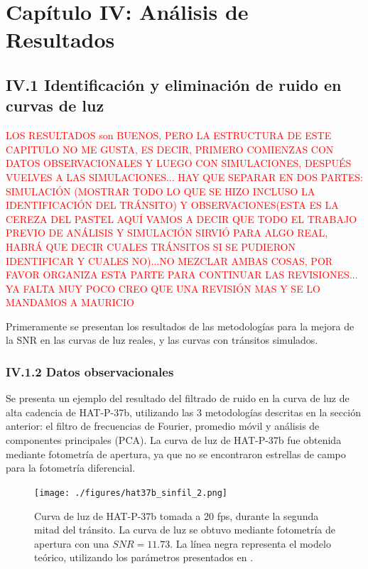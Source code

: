 \chapter*{\textbf{Capítulo IV: Análisis de Resultados}}
\label{ch:Resultados}
\setcounter{chapter}{4}
\setcounter{equation}{0}
\setcounter{figure}{0}
\setcounter{table}{0}

\section*{IV.1 Identificación y eliminación de ruido en curvas de luz}

\textcolor{red}{LOS RESULTADOS son BUENOS, PERO LA ESTRUCTURA DE ESTE CAPITULO NO ME GUSTA, ES DECIR, PRIMERO COMIENZAS CON DATOS OBSERVACIONALES Y LUEGO CON SIMULACIONES, DESPUÉS VUELVES A LAS SIMULACIONES... HAY QUE SEPARAR EN DOS PARTES: SIMULACIÓN (MOSTRAR TODO LO QUE SE HIZO INCLUSO LA IDENTIFICACIÓN DEL TRÁNSITO) Y OBSERVACIONES(ESTA ES LA CEREZA DEL PASTEL AQUÍ VAMOS A DECIR QUE TODO EL TRABAJO PREVIO DE ANÁLISIS Y SIMULACIÓN SIRVIÓ PARA ALGO REAL, HABRÁ QUE DECIR CUALES TRÁNSITOS SI SE PUDIERON IDENTIFICAR Y CUALES NO)...NO MEZCLAR AMBAS COSAS, POR FAVOR ORGANIZA ESTA PARTE PARA CONTINUAR LAS REVISIONES... YA FALTA MUY POCO CREO QUE UNA REVISIÓN MAS Y SE LO MANDAMOS A MAURICIO}

Primeramente se presentan los resultados de las metodologías para la mejora de la SNR en las curvas de luz reales, y las curvas con tránsitos simulados.

\subsection*{IV.1.2 Datos observacionales}

Se presenta un ejemplo del resultado del filtrado de ruido en la curva de luz de alta cadencia de HAT-P-37b, utilizando las 3 metodologías descritas en la sección anterior: el filtro de frecuencias de Fourier, promedio móvil y análisis de componentes principales (PCA). La curva de luz de HAT-P-37b fue obtenida mediante fotometría de apertura, ya que no se encontraron estrellas de campo para la fotometría diferencial.

\begin{figure}[h!]
	\centering
	  \texttt{[image: ./figures/hat37b\_sinfil\_2.png]}
	 \caption{Curva de luz de HAT-P-37b tomada a 20 fps, durante la segunda mitad del tránsito. La curva de luz se obtuvo mediante fotometría de apertura con una $SNR=11.73$. La línea negra representa el modelo teórico, utilizando los parámetros presentados en \cite{bakos2012hat}.}
	  \label{fig_4_1_transito_hat37b}
  \end{figure}


